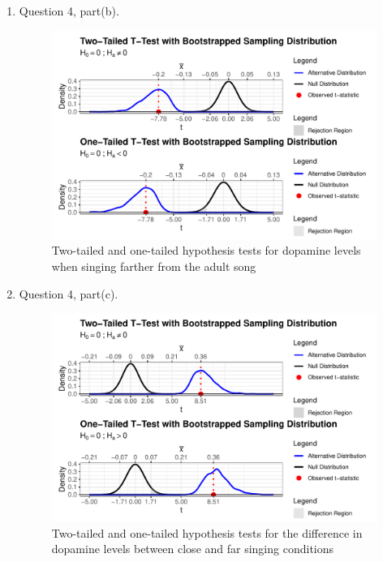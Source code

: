 \documentclass{article}\usepackage[]{graphicx}\usepackage[]{xcolor}
\begin{document}
\begin{enumerate}
\begin{enumerate}
  \item Question 4, part(b).
   \begin{figure}[H]
  \begin{center}
  \includegraphics[scale=.8]{farther.hyp.plots.pdf}
  \caption{Two-tailed and one-tailed hypothesis tests for dopamine levels when singing farther from the adult song}
  \label{plot4}
  \end{center}
\end{figure} 
  
\newpage  
  \item Question 4, part(c).
   \begin{figure}[H]
  \begin{center}
  \includegraphics[scale=.8]{diff.hyp.plots.pdf}
  \caption{Two-tailed and one-tailed hypothesis tests for the difference in dopamine levels between close and far singing conditions}
  \label{plot5}
  \end{center}
\end{figure} 
\end{enumerate}
\end{enumerate}



\end{document}
